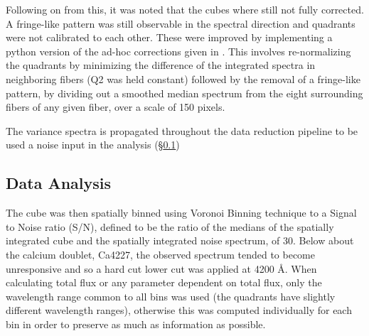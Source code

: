 \documentclass[fleqn,usenatbib,useAMS]{mnras}
\begin{document}

		Following on from this, it was noted that the cubes where still not fully corrected. A fringe-like pattern was still observable in the spectral direction and quadrants were not calibrated to each other. These were improved by implementing a python version of the ad-hoc corrections given in \citet{Lagerholm2012}. This involves re-normalizing the quadrants by minimizing the difference of the integrated spectra in neighboring fibers (Q2 was held constant) followed by the removal of a fringe-like pattern, by dividing out a smoothed median spectrum from the eight surrounding fibers of any given fiber, over a scale of 150 pixels. 

		The variance spectra is propagated throughout the data reduction pipeline to be used a noise input in the analysis (\S \ref{subsec:analysis})

	\subsection{Data Analysis}
		\label{subsec:analysis}
		The cube was then spatially binned using Voronoi Binning technique \citep{Cappellari2003} to a Signal to Noise ratio (S/N), defined to be the ratio of the medians of the spatially integrated cube and the spatially integrated noise spectrum, of 30. Below about the calcium doublet, Ca4227, the observed spectrum tended to become unresponsive and so a hard cut lower cut was applied at 4200 \AA. When calculating total flux or any parameter dependent on total flux, only the wavelength range common to all bins was used (the quadrants have slightly different wavelength ranges), otherwise this was computed individually for each bin in order to preserve as much as information as possible.
\end{document}
